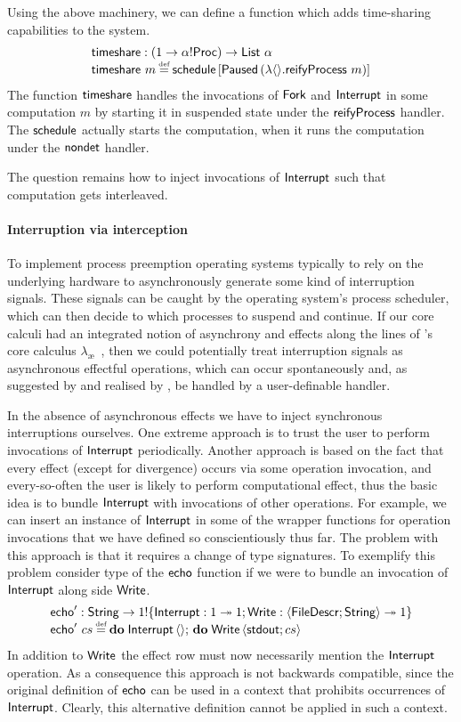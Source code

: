\documentclass[12pt,phd,lfcs,twoside,openright,logo,leftchapter,normalheadings]{infthesis}
\theoremstyle{plain}
\theoremstyle{definition}
\begin{document}
%
Using the above machinery, we can define a function which adds
time-sharing capabilities to the system.
%
\[
  \bl
     \timeshare : (\UnitType \to \alpha \eff \Proc) \to \List~\alpha\\
     \timeshare~m \defas \schedule\,[\Suspended\,(\lambda\Unit.\reifyP~m)]
  \el
\]
%
The function $\mathsf{timeshare}$ handles the invocations of $\mathsf{Fork}$ and
$\mathsf{Interrupt}$ in some computation $m$ by starting it in suspended state
under the $\mathsf{reifyProcess}$ handler. The $\mathsf{schedule}$ actually starts the
computation, when it runs the computation under the $\mathsf{nondet}$ handler.
%

The question remains how to inject invocations of $\mathsf{Interrupt}$ such
that computation gets interleaved.

\paragraph{Interruption via interception}
%
To implement process preemption operating systems typically to rely on
the underlying hardware to asynchronously generate some kind of
interruption signals. These signals can be caught by the operating
system's process scheduler, which can then decide to which processes
to suspend and continue.
%
If our core calculi had an integrated notion of asynchrony and effects
along the lines of \citeauthor{AhmanP21}'s core calculus
$\lambda_{\text{\ae}}$~\cite{AhmanP21}, then we could potentially
treat interruption signals as asynchronous effectful operations, which
can occur spontaneously and, as suggested by \citet{DolanEHMSW17} and
realised by \citet{Poulson20}, be handled by a user-definable handler.
%

In the absence of asynchronous effects we have to inject synchronous
interruptions ourselves.
%
One extreme approach is to trust the user to perform invocations of
$\mathsf{Interrupt}$ periodically.
%
Another approach is based on the fact that every effect (except for
divergence) occurs via some operation invocation, and every-so-often
the user is likely to perform computational effect, thus the basic
idea is to bundle $\mathsf{Interrupt}$ with invocations of other
operations. For example, we can insert an instance of $\mathsf{Interrupt}$ in
some of the wrapper functions for operation invocations that we have
defined so conscientiously thus far. The problem with this approach is
that it requires a change of type signatures. To exemplify this
problem consider type of the $\mathsf{echo}$ function if we were to bundle an
invocation of $\mathsf{Interrupt}$ along side $\mathsf{Write}$.
%
\[
  \bl
    \echo' : \String \to \UnitType \eff \{\Interrupt : \UnitType \opto \UnitType;\Write : \Record{\UFD;\String} \opto \UnitType\}\\
    \echo'~cs \defas \Do\;\Interrupt\,\Unit;\,\Do\;\Write\,\Record{\stdout;cs}
  \el
\]
%
In addition to $\mathsf{Write}$ the effect row must now necessarily mention
the $\mathsf{Interrupt}$ operation. As a consequence this approach is not
backwards compatible, since the original definition of $\mathsf{echo}$ can be
used in a context that prohibits occurrences of $\mathsf{Interrupt}$. Clearly,
this alternative definition cannot be applied in such a context.
\end{document}
